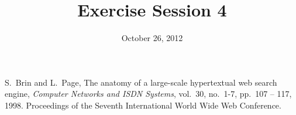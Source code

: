 \documentclass[10pt,a4paper]{article}
\title{Exercise Session 4}
\date{October 26, 2012}
\begin{document}
\lstset{language=[ISO]C++}
\maketitle









%

\begin{thebibliography}{9}

 S.~Brin and L.~Page,
The anatomy of a large-scale hypertextual web search engine,
{\em Computer Networks and ISDN Systems}, vol.~30, no.~1-7, pp.~107 -- 117,
1998. Proceedings of the Seventh International World Wide Web Conference.

\end{thebibliography}
\end{document}
